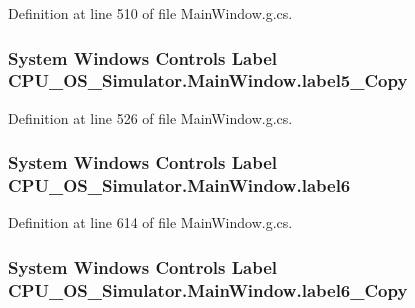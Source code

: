 Definition at line 510 of file Main\+Window.\+g.\+cs.

\hypertarget{class_c_p_u___o_s___simulator_1_1_main_window_aadfe7782d7e25b730849222805a541f9}{}
\subsubsection[{label5\+\_\+\+Copy}]{\setlength{\rightskip}{0pt plus 5cm}System Windows Controls Label C\+P\+U\+\_\+\+O\+S\+\_\+\+Simulator.\+Main\+Window.\+label5\+\_\+\+Copy\hspace{0.3cm}{\ttfamily [package]}}\label{class_c_p_u___o_s___simulator_1_1_main_window_aadfe7782d7e25b730849222805a541f9}


Definition at line 526 of file Main\+Window.\+g.\+cs.

\hypertarget{class_c_p_u___o_s___simulator_1_1_main_window_a8f210008776bb163b4c2c2b160aa52be}{}
\subsubsection[{label6}]{\setlength{\rightskip}{0pt plus 5cm}System Windows Controls Label C\+P\+U\+\_\+\+O\+S\+\_\+\+Simulator.\+Main\+Window.\+label6\hspace{0.3cm}{\ttfamily [package]}}\label{class_c_p_u___o_s___simulator_1_1_main_window_a8f210008776bb163b4c2c2b160aa52be}


Definition at line 614 of file Main\+Window.\+g.\+cs.

\hypertarget{class_c_p_u___o_s___simulator_1_1_main_window_a18612502a8ab2d53d85434e426785022}{}
\subsubsection[{label6\+\_\+\+Copy}]{\setlength{\rightskip}{0pt plus 5cm}System Windows Controls Label C\+P\+U\+\_\+\+O\+S\+\_\+\+Simulator.\+Main\+Window.\+label6\+\_\+\+Copy\hspace{0.3cm}{\ttfamily [package]}}\label{class_c_p_u___o_s___simulator_1_1_main_window_a18612502a8ab2d53d85434e426785022}


